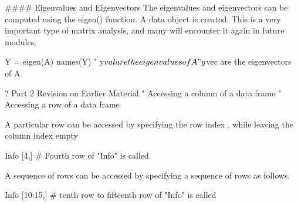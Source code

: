 #### {Eigenvalues and Eigenvectors}
The eigenvalues and eigenvectors can be computed using the eigen() function.  A data object is created.
This is a very important type of matrix analysis, and many will encounter it again in future modules.

Y = eigen(A)
names(Y)
"	y$val are the eigenvalues of A
"	y$vec are the eigenvectors of A

?
Part 2 Revision on Earlier Material
"	Accessing a column of a data frame
"	Accessing a row of a data frame

A particular row can be accessed by specifying the row index , while leaving the column index empty

Info [4,]			# Fourth row of "Info" is called

A sequence of rows can be accessed by specifying a sequence of rows as follows.

Info [10:15,]		# tenth row to fifteenth row of "Info" is called
